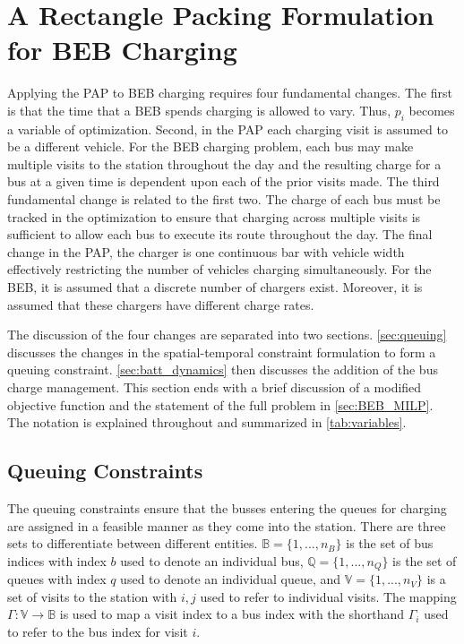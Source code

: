 \section{A Rectangle Packing Formulation for BEB Charging}  \label{sec:problemformulation}

Applying the PAP to BEB charging requires four fundamental changes. The first is that the time that a BEB spends
charging is allowed to vary. Thus, $p_i$ becomes a variable of optimization. Second, in the PAP each charging visit is
assumed to be a different vehicle. For the BEB charging problem, each bus may make multiple visits to the station
throughout the day and the resulting charge for a bus at a given time is dependent upon each of the prior visits made.
The third fundamental change is related to the first two. The charge of each bus must be tracked in
the optimization to ensure that charging across multiple visits is sufficient to allow each bus to execute its route throughout the day.
The final change in the PAP, the charger is one continuous bar with vehicle width effectively restricting the number of vehicles
charging simultaneously. For the BEB, it is assumed that a discrete number of chargers exist. Moreover, it is assumed
that these chargers have different charge rates.

The discussion of the four changes are separated into two sections. \autoref{sec:queuing} discusses the changes in the
spatial-temporal constraint formulation to form a queuing constraint. \autoref{sec:batt_dynamics} then discusses the
addition of the bus charge management. This section ends with a brief discussion of a modified objective function and
the statement of the full problem in \autoref{sec:BEB_MILP}. The notation is explained throughout and summarized in
\autoref{tab:variables}.

\subsection{Queuing Constraints} \label{sec:queuing}

\noindent
The queuing constraints ensure that the busses entering the queues for charging are assigned in a feasible manner as
they come into the station. There are three sets to differentiate between different entities. $\mathbb{B} = \{1, ...,
n_B\}$ is the set of bus indices with index $b$ used to denote an individual bus, $\mathbb{Q} = \{1, ..., n_Q\}$ is the set of
queues with index $q$ used to denote an individual queue, and $\mathbb{V} = \{1, ..., n_V\}$ is a set of visits to the
station with $i,j$ used to refer to individual visits. The mapping $\Gamma: \mathbb{V} \rightarrow \mathbb{B}$ is used to map a visit
index to a bus index with the shorthand $\Gamma_i$ used to refer to the bus index for visit $i$.

